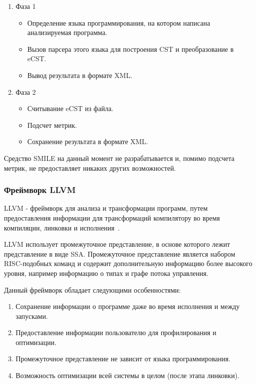 \begin{enumerate}
    \item Фаза 1
    \begin{itemize}
        \item Определение языка программирования, на котором написана
        анализируемая программа.
        \item Вызов парсера этого языка для построения CST и преобразование в
        eCST.
        \item Вывод результата в формате XML.
    \end{itemize}

    \item Фаза 2
    \begin{itemize}
        \item Считывание eCST из файла.
        \item Подсчет метрик.
        \item Сохранение результата в формате XML.
    \end{itemize}
\end{enumerate}

Средство SMILE на данный момент не разрабатывается и, помимо подсчета метрик, не
предоставляет никаких других возможностей.

\subsubsection{Фреймворк LLVM}


LLVM - фреймворк для анализа и трансформации программ, путем предоставления
информации для трансформаций компилятору во время компиляции, линковки и
исполнения~\cite{llvm}.

LLVM использует промежуточное представление, в основе которого лежит
представление в виде SSA. Промежуточное представление является набором
RISC-подобных команд и содержит дополнительную информацию более высокого уровня,
например информацию о типах и графе потока управления.

Данный фреймворк обладает следующими особенностями:

\begin{enumerate}
    \item Сохранение информации о программе даже во время исполнения и между
    запусками.
    \item Предоставление информации пользователю для профилирования и
    оптимизации.
    \item Промежуточное представление не зависит от языка программирования.
    \item Возможность оптимизации всей системы в целом (после этапа линковки).
\end{enumerate}

